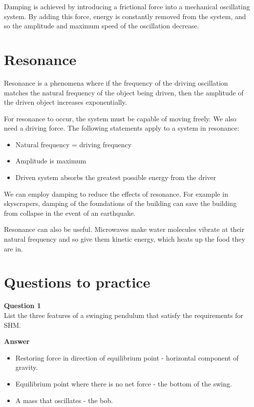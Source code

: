 \documentclass{article}
\begin{document}
Damping is achieved by introducing a frictional force into a mechanical
oscillating system. By adding this force, energy is constantly removed from the
system, and so the amplitude and maximum speed of the oscillation decrease.

\section*{Resonance}
Resonance is a phenomena where if the frequency of the driving oscillation
matches the natural frequency of the object being driven, then the amplitude of
the driven object increases exponentially.

For resonance to occur, the system must be capable of moving freely. We also
need a driving force. The following statements apply to a system in resonance:
\begin{itemize}
	\item Natural frequency = driving frequency
	\item Amplitude is maximum
	\item Driven system absorbs the greatest possible energy from the driver
\end{itemize}

We can employ damping to reduce the effects of resonance. For example in
skyscrapers, damping of the foundations of the building can save the building
from collapse in the event of an earthquake.

Resonance can also be useful. Microwaves make water molecules vibrate at their
natural frequency and so give them kinetic energy, which heats up the food they
are in.

\section*{Questions to practice}
\textbf{Question 1}\\
List the three features of a swinging pendulum that satisfy the requirements for
SHM.

\textbf{Answer}\\
\begin{itemize}
	\item Restoring force in direction of equilibrium point - horizontal
	component of gravity.
	\item Equilibrium point where there is no net force - the bottom of the
	swing.
	\item A mass that oscillates - the bob.
\end{itemize}
\end{document}
